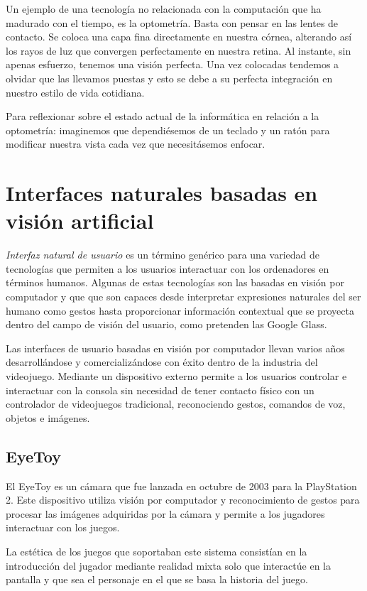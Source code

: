 Un ejemplo de una tecnología no relacionada con la computación que ha madurado con el tiempo, es la optometría. Basta con pensar en las lentes de contacto. Se coloca una capa fina directamente en nuestra córnea, alterando así los rayos de luz que convergen perfectamente en nuestra retina. Al instante, sin apenas esfuerzo, tenemos una visión perfecta. Una vez colocadas tendemos a olvidar que las llevamos puestas y esto se debe a su perfecta integración en nuestro estilo de vida cotidiana. 

Para reflexionar sobre el estado actual de la informática en relación a la optometría: imaginemos que dependiésemos de un teclado y un ratón para modificar nuestra vista cada vez que necesitásemos enfocar.

\section{Interfaces naturales basadas en visión artificial}
\emph{Interfaz natural de usuario} es un término genérico para una variedad de tecnologías que permiten a los usuarios interactuar con los ordenadores en términos humanos. Algunas de estas tecnologías son las basadas en visión por computador y que que son capaces desde interpretar expresiones naturales del ser humano como gestos hasta proporcionar información contextual que se proyecta dentro del campo de visión del usuario, como pretenden las Google Glass. 

Las interfaces de usuario basadas en visión por computador llevan varios años desarrollándose y comercializándose con éxito dentro de la industria del videojuego. Mediante un dispositivo externo permite a los usuarios controlar e interactuar con la consola sin necesidad de tener contacto físico con un controlador de videojuegos tradicional, reconociendo gestos, comandos de voz, objetos e imágenes.

\subsection{EyeToy}
El EyeToy es un cámara que fue lanzada en octubre de 2003 para la PlayStation 2. Este dispositivo utiliza visión por computador y reconocimiento de gestos para procesar las imágenes adquiridas por la cámara y permite a los jugadores interactuar con los juegos.

La estética de los juegos que soportaban este sistema consistían en la introducción del jugador mediante realidad mixta solo que interactúe en la pantalla y que sea el personaje en el que se basa la historia del juego. 

